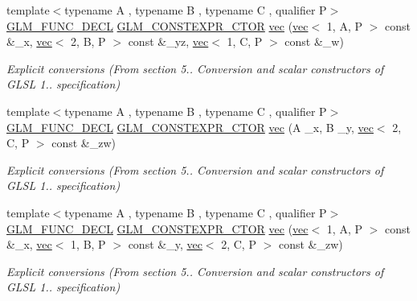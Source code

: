\begin{DoxyCompactItemize}
{\footnotesize template$<$typename A , typename B , typename C , qualifier P$>$ }\\\hyperlink{setup_8hpp_ab2d052de21a70539923e9bcbf6e83a51}{G\+L\+M\+\_\+\+F\+U\+N\+C\+\_\+\+D\+E\+CL} \hyperlink{setup_8hpp_ad34178a09666081abdb573c14d1f4a5a}{G\+L\+M\+\_\+\+C\+O\+N\+S\+T\+E\+X\+P\+R\+\_\+\+C\+T\+OR} \hyperlink{structglm_1_1vec_3_014_00_01_t_00_01_q_01_4_ab79395a0ba268369e6c49872b4385b27}{vec} (\hyperlink{structglm_1_1vec}{vec}$<$ 1, A, P $>$ const \&\+\_\+x, \hyperlink{structglm_1_1vec}{vec}$<$ 2, B, P $>$ const \&\+\_\+yz, \hyperlink{structglm_1_1vec}{vec}$<$ 1, C, P $>$ const \&\+\_\+w)
\begin{DoxyCompactList}\small\item\em Explicit conversions (From section 5.. Conversion and scalar constructors of G\+L\+SL 1.. specification) \end{DoxyCompactList}\item 
{\footnotesize template$<$typename A , typename B , typename C , qualifier P$>$ }\\\hyperlink{setup_8hpp_ab2d052de21a70539923e9bcbf6e83a51}{G\+L\+M\+\_\+\+F\+U\+N\+C\+\_\+\+D\+E\+CL} \hyperlink{setup_8hpp_ad34178a09666081abdb573c14d1f4a5a}{G\+L\+M\+\_\+\+C\+O\+N\+S\+T\+E\+X\+P\+R\+\_\+\+C\+T\+OR} \hyperlink{structglm_1_1vec_3_014_00_01_t_00_01_q_01_4_a5102bf3529e597f13aa16031b1fd71aa}{vec} (A \+\_\+x, B \+\_\+y, \hyperlink{structglm_1_1vec}{vec}$<$ 2, C, P $>$ const \&\+\_\+zw)
\begin{DoxyCompactList}\small\item\em Explicit conversions (From section 5.. Conversion and scalar constructors of G\+L\+SL 1.. specification) \end{DoxyCompactList}\item 
{\footnotesize template$<$typename A , typename B , typename C , qualifier P$>$ }\\\hyperlink{setup_8hpp_ab2d052de21a70539923e9bcbf6e83a51}{G\+L\+M\+\_\+\+F\+U\+N\+C\+\_\+\+D\+E\+CL} \hyperlink{setup_8hpp_ad34178a09666081abdb573c14d1f4a5a}{G\+L\+M\+\_\+\+C\+O\+N\+S\+T\+E\+X\+P\+R\+\_\+\+C\+T\+OR} \hyperlink{structglm_1_1vec_3_014_00_01_t_00_01_q_01_4_adee69249b84755de6d21c4b5aba9af0c}{vec} (\hyperlink{structglm_1_1vec}{vec}$<$ 1, A, P $>$ const \&\+\_\+x, \hyperlink{structglm_1_1vec}{vec}$<$ 1, B, P $>$ const \&\+\_\+y, \hyperlink{structglm_1_1vec}{vec}$<$ 2, C, P $>$ const \&\+\_\+zw)
\begin{DoxyCompactList}\small\item\em Explicit conversions (From section 5.. Conversion and scalar constructors of G\+L\+SL 1.. specification) \end{DoxyCompactList}\item 

\end{DoxyCompactItemize}

